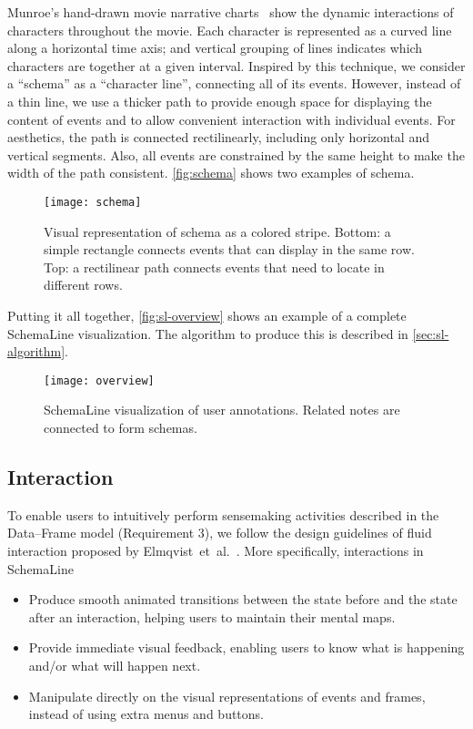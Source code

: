 Munroe's hand-drawn movie narrative charts~\cite{Munroe2009} show the dynamic interactions of characters throughout the movie. Each character is represented as a curved line along a horizontal time axis; and vertical grouping of lines indicates which characters are together at a given interval. Inspired by this technique, we consider a ``schema'' as a ``character line'', connecting all of its events. However, instead of a thin line, we use a thicker path to provide enough space for displaying the content of events and to allow convenient interaction with individual events. For aesthetics, the path is connected rectilinearly, including only horizontal and vertical segments. Also,  all events are constrained by the same height to make the width of the path consistent. \autoref{fig:schema} shows two examples of schema. 

\begin{figure}[!htb]
	\centering
	\texttt{[image: schema]}
	\caption{Visual representation of schema as a colored stripe. Bottom: a simple rectangle connects events that can display in the same row. Top: a rectilinear path connects events that need to locate in different rows.}
	\label{fig:schema}
\end{figure}

Putting it all together, \autoref{fig:sl-overview} shows an example of a complete SchemaLine visualization. The algorithm to produce this is described in \autoref{sec:sl-algorithm}.

\begin{figure}[!htb]
	\centering
	\texttt{[image: overview]}
	\caption{SchemaLine visualization of user annotations. Related notes are connected to form schemas.}
	\label{fig:sl-overview}
\end{figure}

\subsection{Interaction}
To enable users to intuitively perform sensemaking activities described in the Data--Frame model (Requirement 3), we follow the design guidelines of fluid interaction proposed by Elmqvist~et~al.~\cite{Elmqvist2011}. More specifically, interactions in SchemaLine 
\begin{itemize}
	\item Produce smooth animated transitions between the state before and the state after an interaction, helping users to maintain their mental maps.
	\item Provide immediate visual feedback, enabling users to know what is happening and/or what will happen next.
	\item Manipulate directly on the visual representations of events and frames, instead of using extra menus and buttons.
\end{itemize}

